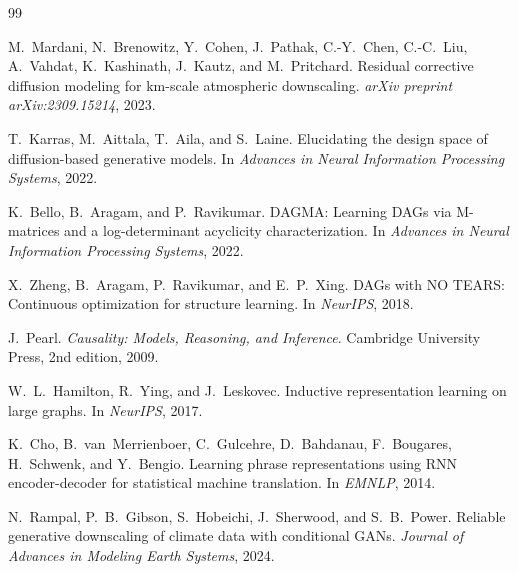 \documentclass[14pt,a4paper,openany]{extreport}
\theoremstyle{definition}
\begin{document}
\begin{thebibliography}{99}

 M.~Mardani, N.~Brenowitz, Y.~Cohen, J.~Pathak, C.-Y.~Chen, C.-C.~Liu, A.~Vahdat, K.~Kashinath, J.~Kautz, and M.~Pritchard. Residual corrective diffusion modeling for km-scale atmospheric downscaling. \emph{arXiv preprint arXiv:2309.15214}, 2023.

 T.~Karras, M.~Aittala, T.~Aila, and S.~Laine. Elucidating the design space of diffusion-based generative models. In \emph{Advances in Neural Information Processing Systems}, 2022.

 K.~Bello, B.~Aragam, and P.~Ravikumar. DAGMA: Learning DAGs via M-matrices and a log-determinant acyclicity characterization. In \emph{Advances in Neural Information Processing Systems}, 2022.

 X.~Zheng, B.~Aragam, P.~Ravikumar, and E.~P.~Xing. DAGs with NO TEARS: Continuous optimization for structure learning. In \emph{NeurIPS}, 2018.

 J.~Pearl. \emph{Causality: Models, Reasoning, and Inference}. Cambridge University Press, 2nd edition, 2009.

 W.~L.~Hamilton, R.~Ying, and J.~Leskovec. Inductive representation learning on large graphs. In \emph{NeurIPS}, 2017.

 K.~Cho, B.~van~Merrienboer, C.~Gulcehre, D.~Bahdanau, F.~Bougares, H.~Schwenk, and Y.~Bengio. Learning phrase representations using RNN encoder-decoder for statistical machine translation. In \emph{EMNLP}, 2014.

 N.~Rampal, P.~B.~Gibson, S.~Hobeichi, J.~Sherwood, and S.~B.~Power. Reliable generative downscaling of climate data with conditional GANs. \emph{Journal of Advances in Modeling Earth Systems}, 2024.

\end{thebibliography}
\end{document}
